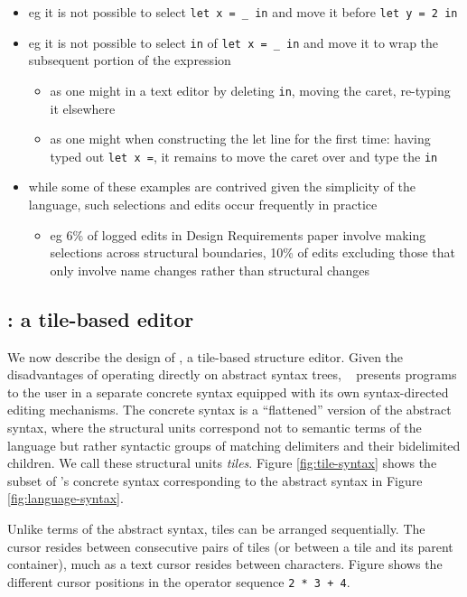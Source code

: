 \begin{itemize}
\begin{itemize}
    \item eg it is not possible to select \texttt{let x = \_ in} and
      move it before \texttt{let y = 2 in}
    \item eg it is not possible to select \texttt{in} of \texttt{let x = \_ in}
      and move it to wrap the subsequent portion of the expression
    \begin{itemize}
      \item as one might in a text editor by deleting \texttt{in},
        moving the caret, re-typing it elsewhere
      \item as one might when constructing the let line for the first time:
        having typed out \texttt{let x =}, it remains to move the caret over
        and type the \texttt{in}
    \end{itemize}
    \item while some of these examples are contrived given the simplicity of
      the language, such selections and edits occur frequently in practice
    \begin{itemize}
      \item eg 6\% of logged edits in Design Requirements
        paper involve making
        selections across structural boundaries, 10\% of edits excluding those
        that only involve name changes rather than structural changes
    \end{itemize}
  \end{itemize}
\end{itemize}

\subsection{\tylr: a tile-based editor}

We now describe the design of \tylr, a tile-based structure
editor.
Given the disadvantages of operating directly on abstract syntax
trees, \tylr~ presents programs to the user in a separate
concrete syntax equipped with its own syntax-directed editing
mechanisms.
The concrete syntax is a ``flattened'' version of the abstract
syntax, where the structural units correspond not to semantic
terms of the language but rather syntactic groups of matching
delimiters and their bidelimited children.
We call these structural units \emph{tiles}.
Figure \ref{fig:tile-syntax} shows the subset of \tylr's
concrete syntax corresponding to the abstract syntax in
Figure \ref{fig:language-syntax}.

Unlike terms of the abstract syntax, tiles can be arranged
sequentially.
The cursor resides between consecutive pairs of
tiles (or between a tile and its parent container),
much as a text cursor resides between characters.
Figure  shows the different cursor positions
in the operator sequence \texttt{2 * 3 + 4}.

